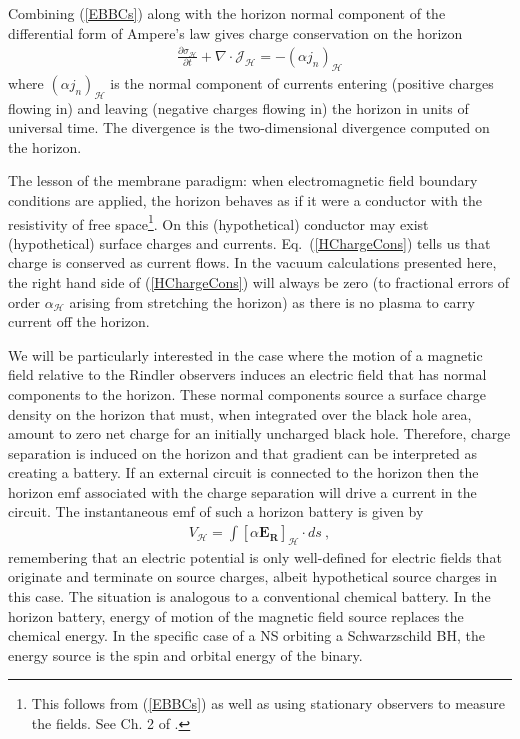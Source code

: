 Combining (\ref{EBBCs})  along with the horizon normal component of the
differential form of Ampere's law gives charge conservation on the horizon 
\begin{align}
\frac{\partial \sigma_{\mathcal{H}}}{\partial t} + \nabla \cdot \mathbf{\mathcal{J}_{\mathcal{H}}} = -\left( \alpha j_n \right)_{\mathcal{H}}
\label{HChargeCons}
\end{align}
where $\left( \alpha j_n \right)_{\mathcal{H}}$ is the normal component of 
currents entering (positive charges flowing in) and leaving (negative 
charges flowing in) the horizon in units of universal time. The divergence 
is the two-dimensional divergence computed on the horizon. 

The lesson of the membrane paradigm: when electromagnetic field
boundary conditions are
applied, the horizon behaves as if it were a conductor with
the resistivity of free space\footnote{This follows from (\ref{EBBCs}) as well as using
stationary observers to measure the fields. See Ch. 2 of \cite{MPBook}.}. On this (hypothetical) conductor may
exist (hypothetical) surface
charges and currents. Eq.\ (\ref{HChargeCons}) tells us that
charge is conserved as current flows.
In the vacuum calculations presented here, the right hand side of
(\ref{HChargeCons}) will always be zero (to fractional errors of order
$\alpha_{\mathcal{H}}$ arising from stretching the horizon) as there
is no plasma to carry current off the horizon.

We will be particularly interested in the case where the motion of a
magnetic field relative to the Rindler observers induces an electric
field that has normal components to the horizon. These normal
components source a surface charge density on the horizon that must, when
integrated over the black hole area, amount to zero net charge for an
initially uncharged black hole. Therefore, charge separation is
induced on the horizon and that gradient
can be interpreted as creating a battery. 
If an external circuit is connected to the horizon then
the horizon emf associated with the charge
separation will drive a current in the circuit. The instantaneous emf of such a
horizon battery is given by
\begin{align}
V_{\mathcal{H}} = \int{\left[ \alpha \mathbf{E_R}\right]_{\mathcal{H}} \cdot ds} \ ,
\label{VH}
\end{align}
remembering that an electric potential is only well-defined for
electric fields that originate and terminate on source charges, albeit
hypothetical source charges in this case.
The situation is analogous to a conventional chemical battery. 
In the
horizon battery, energy of motion of the magnetic field source
replaces the chemical energy. In the
specific case of a NS orbiting a Schwarzschild BH,
the energy source is the spin and orbital energy of the binary. 

